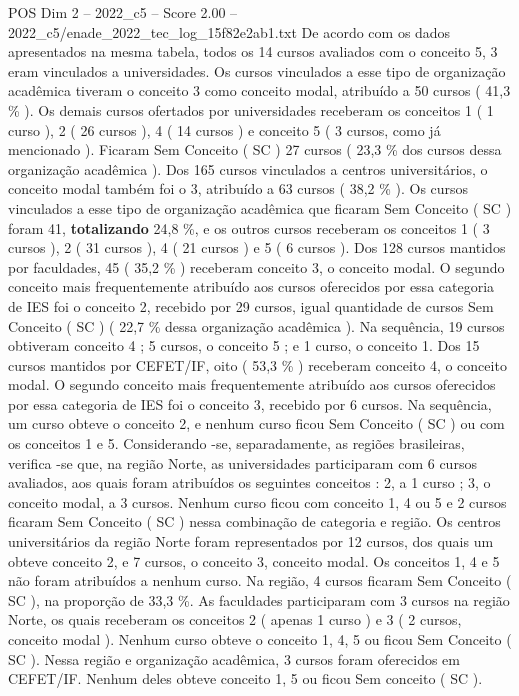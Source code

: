 \begin{textsample}{POS Dim 2 – 2022\_c5 – Score 2.00 – 2022\_c5/enade\_2022\_tec\_log\_15f82e2ab1.txt}
De acordo com os dados apresentados na mesma tabela, todos os 14 cursos avaliados com o conceito 5, 3 eram vinculados a universidades.
Os cursos vinculados a esse tipo de organização acadêmica tiveram o conceito 3 como conceito modal, atribuído a 50 cursos ( 41,3 \% ).
Os demais cursos ofertados por universidades receberam os conceitos 1 ( 1 curso ), 2 ( 26 cursos ), 4 ( 14 cursos ) e conceito 5 ( 3 cursos, como já mencionado ).
Ficaram Sem Conceito ( SC ) 27 cursos ( 23,3 \% dos cursos dessa organização acadêmica ).
Dos 165 cursos vinculados a centros universitários, o conceito modal também foi o 3, atribuído a 63 cursos ( 38,2 \% ).
Os cursos vinculados a esse tipo de organização acadêmica que ficaram Sem Conceito ( SC ) foram 41, \textbf{totalizando} 24,8 \%, e os outros cursos receberam os conceitos 1 ( 3 cursos ), 2 ( 31 cursos ), 4 ( 21 cursos ) e 5 ( 6 cursos ).
Dos 128 cursos mantidos por faculdades, 45 ( 35,2 \% ) receberam conceito 3, o conceito modal.
O segundo conceito mais frequentemente atribuído aos cursos oferecidos por essa categoria de IES foi o conceito 2, recebido por 29 cursos, igual quantidade de cursos Sem Conceito ( SC ) ( 22,7 \% dessa organização acadêmica ).
Na sequência, 19 cursos obtiveram conceito 4 ; 5 cursos, o conceito 5 ; e 1 curso, o conceito 1.
Dos 15 cursos mantidos por CEFET/IF, oito ( 53,3 \% ) receberam conceito 4, o conceito modal.
O segundo conceito mais frequentemente atribuído aos cursos oferecidos por essa categoria de IES foi o conceito 3, recebido por 6 cursos.
Na sequência, um curso obteve o conceito 2, e nenhum curso ficou Sem Conceito ( SC ) ou com os conceitos 1 e 5.
Considerando -se, separadamente, as regiões brasileiras, verifica -se que, na região Norte, as universidades participaram com 6 cursos avaliados, aos quais foram atribuídos os seguintes conceitos : 2, a 1 curso ; 3, o conceito modal, a 3 cursos.
Nenhum curso ficou com conceito 1, 4 ou 5 e 2 cursos ficaram Sem Conceito ( SC ) nessa combinação de categoria e região.
Os centros universitários da região Norte foram representados por 12 cursos, dos quais um obteve conceito 2, e 7 cursos, o conceito 3, conceito modal.
Os conceitos 1, 4 e 5 não foram atribuídos a nenhum curso.
Na região, 4 cursos ficaram Sem Conceito ( SC ), na proporção de 33,3 \%.
As faculdades participaram com 3 cursos na região Norte, os quais receberam os conceitos 2 ( apenas 1 curso ) e 3 ( 2 cursos, conceito modal ).
Nenhum curso obteve o conceito 1, 4, 5 ou ficou Sem Conceito ( SC ).
Nessa região e organização acadêmica, 3 cursos foram oferecidos em CEFET/IF.
Nenhum deles obteve conceito 1, 5 ou ficou Sem conceito ( SC ).

\end{textsample}
